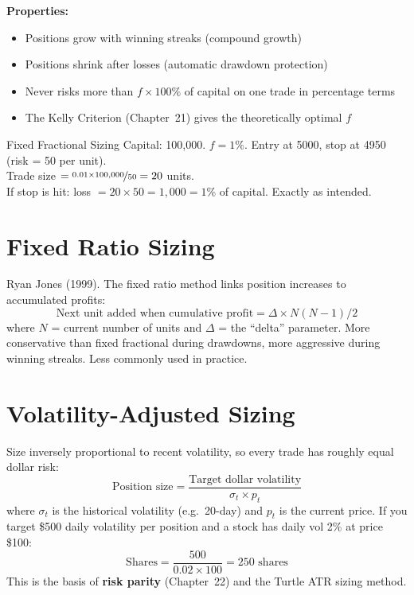 \documentclass[12pt,a4paper,openany]{report}
\theoremstyle{definition}
\begin{document}
\textbf{Properties:}
\begin{itemize}
  \item Positions grow with winning streaks (compound growth)
  \item Positions shrink after losses (automatic drawdown protection)
  \item Never risks more than $f\times 100\%$ of capital on one trade in percentage terms
  \item The Kelly Criterion (Chapter~21) gives the theoretically optimal $f$
\end{itemize}

\begin{examplebox}{Fixed Fractional Sizing}
Capital: 100{,}000. $f = 1\%$. Entry at 5000, stop at 4950 (risk = 50 per unit). \\
Trade size $= \nicefrac{0.01 \times 100{,}000}{50} = 20$ units. \\
If stop is hit: loss $= 20 \times 50 = 1{,}000 = 1\%$ of capital. Exactly as intended.
\end{examplebox}

\section{Fixed Ratio Sizing}

Ryan Jones (1999). The fixed ratio method links position increases to accumulated profits:
\[
  \text{Next unit added when cumulative profit} = \Delta \times N(N-1)/2
\]
where $N$ = current number of units and $\Delta$ = the ``delta'' parameter. More conservative than fixed fractional during drawdowns, more aggressive during winning streaks. Less commonly used in practice.

\section{Volatility-Adjusted Sizing}

Size inversely proportional to recent volatility, so every trade has roughly equal dollar risk:
\begin{equation}
  \text{Position size} = \frac{\text{Target dollar volatility}}{\sigma_t \times p_t}
\end{equation}
where $\sigma_t$ is the historical volatility (e.g.\ 20-day) and $p_t$ is the current price. If you target \$500 daily volatility per position and a stock has daily vol 2\% at price \$100:
\[
  \text{Shares} = \frac{500}{0.02 \times 100} = 250 \text{ shares}
\]
This is the basis of \textbf{risk parity} (Chapter~22) and the Turtle ATR sizing method.
\end{document}
